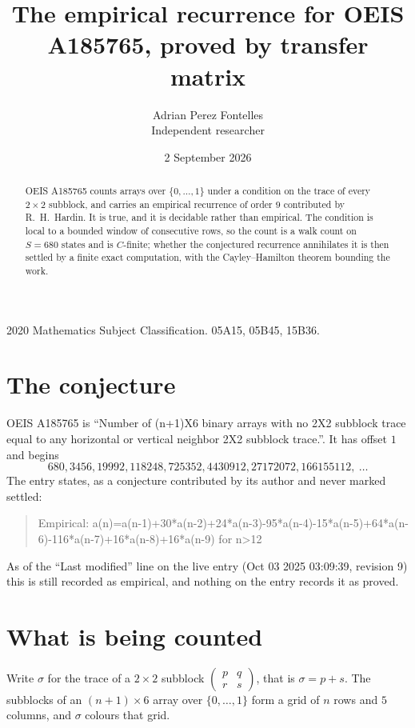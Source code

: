 \documentclass[11pt,a4paper]{article}
\title{The empirical recurrence for OEIS A185765, proved by transfer matrix}
\author{Adrian Perez Fontelles\\ \small Independent researcher}
\date{2 September 2026}
\theoremstyle{plain}
\theoremstyle{definition}
\begin{document}
\maketitle

\begin{abstract}
OEIS A185765 counts arrays over $\{0,\dots,1\}$ under a condition on the trace of every
$2\times2$ subblock, and carries an empirical recurrence of order $9$ contributed by
R.~H.~Hardin. It is true, and it is decidable rather than empirical. The condition is local to
a bounded window of consecutive rows, so the count is a walk count on $S=680$ states and is
$C$-finite; whether the conjectured recurrence annihilates it is then settled by a finite exact
computation, with the Cayley--Hamilton theorem bounding the work.
\end{abstract}

\noindent\small 2020 Mathematics Subject Classification. 05A15, 05B45, 15B36.\normalsize

\section{The conjecture}

OEIS A185765 is ``Number of (n+1)X6 binary arrays with no 2X2 subblock trace equal to any horizontal or vertical neighbor 2X2 subblock trace.''. It has offset $1$ and begins
\[
680, 3456, 19992, 118248, 725352, 4430912, 27172072, 166155112,\ \dots
\]
The entry states, as a conjecture contributed by its author and never marked settled:
\begin{quote}
Empirical: a(n)=a(n-1)+30*a(n-2)+24*a(n-3)-95*a(n-4)-15*a(n-5)+64*a(n-6)-116*a(n-7)+16*a(n-8)+16*a(n-9) for n>12
\end{quote}
As of the ``Last modified'' line on the live entry (Oct 03 2025 03:09:39, revision 9) this is still
recorded as empirical, and nothing on the entry records it as proved.

\section{What is being counted}

Write $\sigma$ for the trace of a $2\times2$ subblock
$\begin{pmatrix}p&q\\r&s\end{pmatrix}$, that is $\sigma=p+s$. The subblocks of an
$(n+1)\times6$ array over $\{0,\dots,1\}$ form a grid of $n$ rows and $5$
columns, and $\sigma$ colours that grid.
\end{document}
